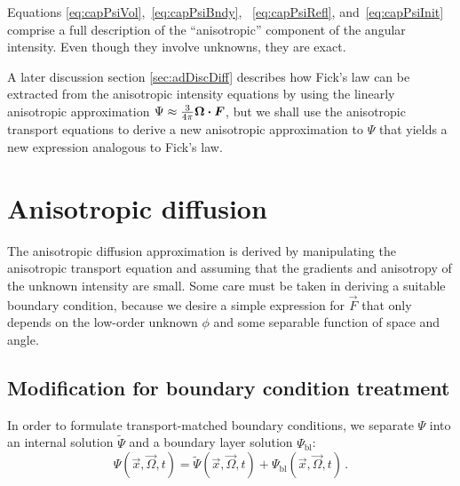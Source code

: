 Equations \eqref{eq:capPsiVol},~\eqref{eq:capPsiBndy},%
~\eqref{eq:capPsiRefl}, and~\eqref{eq:capPsiInit}
comprise a full description of the ``anisotropic'' component of the angular
intensity. Even though they involve unknowns, they are exact.

A later discussion section \ref{sec:adDiscDiff} describes how Fick's law can
be extracted from the anisotropic intensity equations
by using the linearly anisotropic approximation $\Psi\approx \frac{3}{4\pi}
\bm{\Omega}\bm{\cdot}\bm{F}$, but we shall use the anisotropic transport equations to
derive a new anisotropic approximation to $\Psi$ that yields a new expression
analogous to Fick's law.

\section{Anisotropic diffusion}
The anisotropic diffusion approximation is derived by manipulating the
anisotropic transport equation and assuming that the gradients and anisotropy
of the unknown intensity are small. Some care must be taken in deriving
a suitable boundary condition, because we desire a simple expression for
$\vec{F}$ that only depends on the low-order unknown $\phi$ and some separable
function of space and angle.

\subsection{Modification for boundary condition treatment}
In order to formulate transport-matched boundary conditions, we separate $\Psi$
into an internal solution $\tilde\Psi$ and a boundary layer solution
$\Psi_\mathrm{bl}$:
\begin{equation} \label{eq:boundaryLayerPsi}
  \Psi(\vec{x}, \vec{\Omega}, t)
  = \tilde\Psi(\vec{x}, \vec{\Omega}, t)
  + \Psi_\mathrm{bl}(\vec{x}, \vec{\Omega}, t)\,.
\end{equation}


